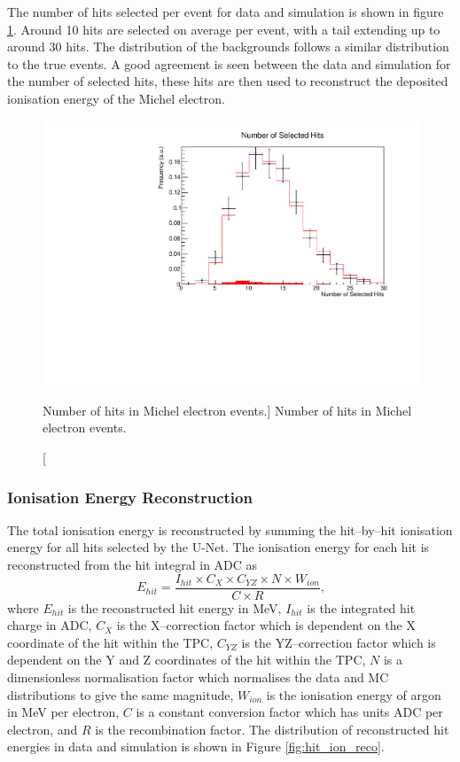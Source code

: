 The number of hits selected per event for data and simulation is shown in 
figure \ref{fig:mich_n_hits}. Around 10 hits are selected on average per 
event, with a tail extending up to around 30 hits. The distribution of the
backgrounds follows a similar distribution to the true events. A good agreement
is seen between the data and simulation for the number of selected hits, these
hits are then used to reconstruct the deposited ionisation energy of the Michel
electron.
\begin{figure}
	\centering
	\includegraphics[width=\textwidth]{figures/mich_n_hits.pdf}
	\caption
	[Number of hits in Michel electron events.]
	{Number of hits in Michel electron events.}
	\label{fig:mich_n_hits}
\end{figure}

\subsubsection{Ionisation Energy Reconstruction}

The total ionisation energy is reconstructed by summing the hit--by--hit
ionisation energy for all hits selected by the U-Net. The ionisation energy for
each hit is reconstructed from the hit integral in ADC as 
\begin{equation}
	E_{hit} = \frac{I_{hit} \times C_X \times C_{YZ} \times N \times W_{ion}}{C \times R}\mbox{,}
\end{equation}
where $E_{hit}$ is the reconstructed hit energy in MeV, $I_{hit}$ is the
integrated hit charge in ADC, $C_X$ is the X--correction factor which is
dependent on the X coordinate of the hit within the TPC, $C_{YZ}$ is the 
YZ--correction factor which is dependent on the Y and Z coordinates 
of the hit within the TPC, $N$ is a dimensionless normalisation factor which
normalises the data and MC distributions to give the same magnitude, $W_{ion}$
is the ionisation energy of argon in MeV per electron, $C$ is a constant
conversion factor which has units ADC per electron, and $R$ is the
recombination factor. The distribution of reconstructed hit energies in
\protodune{} data and simulation is shown in Figure \ref{fig:hit_ion_reco}.

